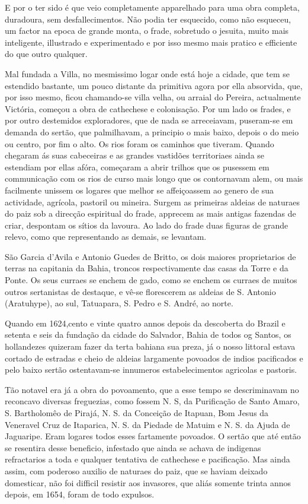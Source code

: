 E por o ter sido é que veio completamente apparelhado para uma obra completa, duradoura, sem desfallecimentos. Não podia ter esquecido, como não esqueceu, um factor na epoca  de grande monta, o frade, sobretudo o jesuita, muito mais inteligente, illustrado e experimentado e por isso mesmo mais  pratico e efficiente do que outro qualquer.

Mal fundada a Villa, no mesmissimo logar  onde  está hoje  a cidade, que tem se estendido bastante, um pouco distante da  primitiva agora por ella absorvida, que, por isso mesmo, ficou chamando-se villa velha, ou arraial do Pereira, actualmente Victória, começou a obra de cathechese e colonisação. Por um lado os frades, e  por outro  destemidos exploradores, que de nada se arreceiavam, puseram-se em demanda do sertão, que palmilhavam, a principio o mais baixo, depois o do meio ou centro, por fim o alto. Os rios foram os caminhos que tiveram. Quando chegaram ás suas cabeceiras e as grandes vastidões territoriaes ainda se estendiam por ellas afóra,  começaram a abrir trilhos que os pusessem em communicação com os rios de curso mais longo que os contornavam alem, ou mais facilmente unissem os logares que melhor se  affeiçoassem ao genero de sua actividade, agrícola, pastoril ou mineira. Surgem as primeiras aldeias de naturaes do paiz sob a direcção espiritual do frade, apprecem as mais antigas fazendas de criar, despontam os sítios da lavoura. Ao lado do frade duas figuras de grande relevo, como que representando as demais, se levantam.

São Garcia d'Avila e Antonio Guedes de Britto,  os dois maiores proprietarios de terras na capitania da Bahia, troncos respectivamente das casas da Torre e da Ponte. Os seus curraes se enchem de gado, como se enchem os curraes de muitos outros sertanistas de destaque, e vê-se florescerem as aldeias de S. Antonio (Aratuhype), ao sul, Tatuapara, S. Pedro e S. André, ao norte.

Quando em 1624,cento e vinte quatro annos depois da descoberta do Brazil e setenta e seis da fundação da cidade do Salvador, Bahia de todos og Santos, os hollandezes quizeram fazer da terta bahiana sua preza, já o nosso littoral estava cortado de estradas e cheio de aldeias largamente povoados de indios pacificados e pelo baixo sertão ostentavam-se innumeros estabelecimentos agricolas e pastoris.

Tão notavel era já a obra do povoamento, que a esse tempo se descriminavam no reconcavo diversas freguezias, como fossem N. S, da Purificação de Santo Amaro, S. Bartholomêo de Pirajá,  N. S. da Conceição de Itapuan, Bom Jesus da Veneravel Cruz de Itaparica, N. S. da Piedade de Matuim e N. S. da Ajuda de Jaguaripe. Eram logares todos esses fartamente povoados. O sertão que até então se resentira
 desse beneficio, infestado que ainda se achava de indigenas refractarios a toda e qualquer tentativa de cathechese e pacificação. Mas ainda assim,  com poderoso auxilio de naturaes  do paiz, que se haviam deixado domesticar, não foi difficil resistir aos invasores, que aliás somente trinta annos  depois, em 1654, foram de todo expulsos.
 
